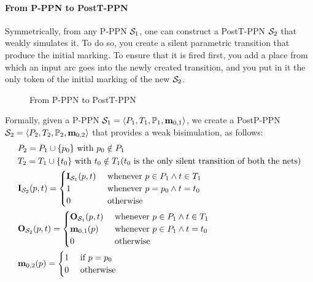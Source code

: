 \paragraph{From P-PPN to PostT-PPN}
\label{sec:p-ppn-to-postt-ppn}

Symmetrically, from any P-PPN $\namePPN[1]$, one can construct a PostT-PPN $\namePPN[2]$ that weakly simulates it\cite{David17}.
To do so, you create a silent parametric transition that produce the initial marking.
To ensure that it is fired first, you add a place from which an input arc goes into the newly created transition, and you put in it the only token of the initial marking of the new $\namePPN[2]$.

\begin{figure}[htbp]
  \centering
  
  \par
  \caption{From P-PPN to PostT-PPN}
  \label{fig:pppn-to-posttppn}
\end{figure}

Formally, given a P-PPN $\defPPN[1]$, we create a PostP-PPN $\defPPN[2]$ that provides a weak bisimulation, as follows:
\begin{align*}
  &\places_2 = \places_1 \cup           \{ p_0 \}
    \text{ with } p_0 \notin \places_1 \\
  &\transitions_2 = \transitions_1 \cup \{ t_0 \}
    \text{ with } t_0 \notin \transitions_1 \text{($t_0$ is  the only silent transition of both the nets)} \\
  &\inm[\namePPN[2]][p,t] = \begin{cases}
      \inm[\namePPN[1]][p,t] &\text{ whenever } p \in \places_1 \wedge t \in \transitions_1 \\
      1 &\text{ whenever } p = p_0 \wedge t = t_0 \\
      0 &\tothrw
    \end{cases} \\
  &\outm[\namePPN[2]][p,t] = \begin{cases}
      \outm[\namePPN[1]][p,t] &\text{ whenever } p \in \places_1 \wedge t \in \transitions_1 \\
      \mar_{0,1}(p) &\text{ whenever } p \in \places_1 \wedge t = t_0 \\
      0 &\tothrw
    \end{cases} \\
  &\mar_{0,2}(p) = \begin{cases}
      1 & \tif p = p_0 \\
      0 & \tothrw
    \end{cases}
\end{align*}

